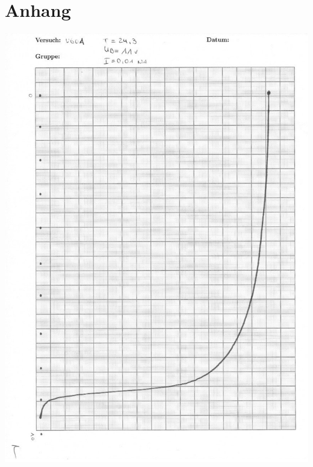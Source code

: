 \section*{Anhang}


\centering

\null\vfill
\includegraphics[width=0.9\linewidth]{content/messung/anhang/1.jpg}
\vfill\null
\newpage
\null\vfill

